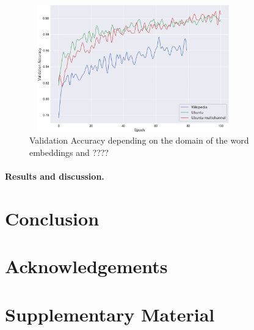 \documentclass[10pt,twocolumn,letterpaper]{article}
\begin{document}
\begin{figure}[t]
\begin{center}
\includegraphics[width=90mm, height= 55mm, scale=1]{img/embeddings_accuracy.png}
\end{center}
\caption{Validation Accuracy depending on the domain of the word embeddings and ????}
\label{fig:embeddings}
\end{figure}



\paragraph{Results and discussion.}


\section{Conclusion} 



\section*{Acknowledgements}


\appendix
\section{Supplementary Material} 






{\small


}
\end{document}
